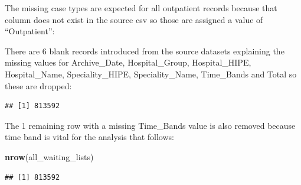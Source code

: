\documentclass[
  12pt,
]{article}
\newenvironment{Shaded}{\begin{snugshade}}{\end{snugshade}}
\newcommand{\KeywordTok}[1]{\textcolor[rgb]{0.13,0.29,0.53}{\textbf{#1}}}
\newcommand{\NormalTok}[1]{#1}
\newcommand{\OperatorTok}[1]{\textcolor[rgb]{0.81,0.36,0.00}{\textbf{#1}}}
\newcommand{\StringTok}[1]{\textcolor[rgb]{0.31,0.60,0.02}{#1}}
\begin{document}
The missing case types are expected for all outpatient records because that column does not exist in the source csv so those are assigned a value of ``Outpatient'':
\small

\begin{Shaded}
\end{Shaded}

\normalsize

There are 6 blank records introduced from the source datasets explaining the missing values for Archive\_Date, Hospital\_Group, Hospital\_HIPE, Hospital\_Name, Speciality\_HIPE, Speciality\_Name, Time\_Bands and Total so these are dropped:

\begin{Shaded}
\end{Shaded}

\begin{verbatim}
## [1] 813592
\end{verbatim}

The 1 remaining row with a missing Time\_Bands value is also removed because time band is vital for the analysis that follows:
\small

\begin{Shaded}
\begin{Highlighting}[]
\KeywordTok{nrow}\NormalTok{(all\_waiting\_lists)}
\end{Highlighting}
\end{Shaded}

\begin{verbatim}
## [1] 813592
\end{verbatim}

\begin{Shaded}
\end{Shaded}
\end{document}

